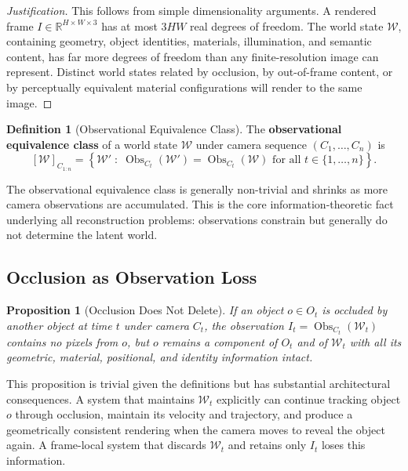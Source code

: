 \documentclass[11pt,a4paper]{article}
\theoremstyle{plain}
\newtheorem{proposition}[theorem]{Proposition}
\theoremstyle{definition}
\newtheorem{definition}[theorem]{Definition}
\theoremstyle{remark}
\DeclareMathOperator{\Obs}{Obs}
\begin{document}
\begin{proof}[Justification]
This follows from simple dimensionality arguments. A rendered frame $I \in \mathbb{R}^{H \times W \times 3}$ has at most $3HW$ real degrees of freedom. The world state $\mathcal{W}$, containing geometry, object identities, materials, illumination, and semantic content, has far more degrees of freedom than any finite-resolution image can represent. Distinct world states related by occlusion, by out-of-frame content, or by perceptually equivalent material configurations will render to the same image.
\end{proof}

\begin{definition}[Observational Equivalence Class]
The \textbf{observational equivalence class} of a world state $\mathcal{W}$ under camera sequence $(C_1, \ldots, C_n)$ is
\[
[\mathcal{W}]_{C_{1:n}} = \left\{ \mathcal{W}' \;:\; \Obs_{C_t}(\mathcal{W}') = \Obs_{C_t}(\mathcal{W}) \text{ for all } t \in \{1, \ldots, n\} \right\}.
\]
\end{definition}

The observational equivalence class is generally non-trivial and shrinks as more camera observations are accumulated. This is the core information-theoretic fact underlying all reconstruction problems: observations constrain but generally do not determine the latent world.

\subsection{Occlusion as Observation Loss}

\begin{proposition}[Occlusion Does Not Delete]
If an object $o \in O_t$ is occluded by another object at time $t$ under camera $C_t$, the observation $I_t = \Obs_{C_t}(\mathcal{W}_t)$ contains no pixels from $o$, but $o$ remains a component of $O_t$ and of $\mathcal{W}_t$ with all its geometric, material, positional, and identity information intact.
\end{proposition}

This proposition is trivial given the definitions but has substantial architectural consequences. A system that maintains $\mathcal{W}_t$ explicitly can continue tracking object $o$ through occlusion, maintain its velocity and trajectory, and produce a geometrically consistent rendering when the camera moves to reveal the object again. A frame-local system that discards $\mathcal{W}_t$ and retains only $I_t$ loses this information.
\end{document}
